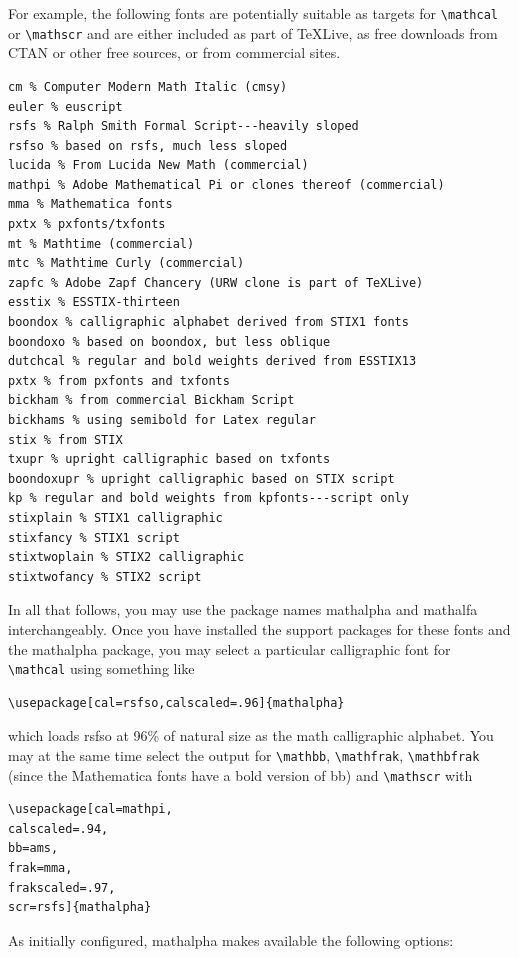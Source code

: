 \documentclass[11pt]{article}
\begin{document}
For example, the following fonts are potentially suitable as  targets for \verb|\mathcal| or \verb|\mathscr| and are either included as part of \TeX Live, as free downloads from CTAN or other free sources, or from commercial sites.
\begin{verbatim}
cm % Computer Modern Math Italic (cmsy)
euler % euscript
rsfs % Ralph Smith Formal Script---heavily sloped
rsfso % based on rsfs, much less sloped
lucida % From Lucida New Math (commercial)
mathpi % Adobe Mathematical Pi or clones thereof (commercial)
mma % Mathematica fonts
pxtx % pxfonts/txfonts
mt % Mathtime (commercial)
mtc % Mathtime Curly (commercial)
zapfc % Adobe Zapf Chancery (URW clone is part of TeXLive)
esstix % ESSTIX-thirteen
boondox % calligraphic alphabet derived from STIX1 fonts
boondoxo % based on boondox, but less oblique
dutchcal % regular and bold weights derived from ESSTIX13
pxtx % from pxfonts and txfonts
bickham % from commercial Bickham Script
bickhams % using semibold for Latex regular
stix % from STIX
txupr % upright calligraphic based on txfonts
boondoxupr % upright calligraphic based on STIX script 
kp % regular and bold weights from kpfonts---script only
stixplain % STIX1 calligraphic
stixfancy % STIX1 script
stixtwoplain % STIX2 calligraphic
stixtwofancy % STIX2 script
\end{verbatim}
In all that follows, you may use the package names \textsf{mathalpha} and \textsf{mathalfa} interchangeably. Once you have installed the support packages for these fonts and the \textsf{mathalpha} package, you may select a particular calligraphic font for \verb|\mathcal| using something like
\begin{verbatim}
\usepackage[cal=rsfso,calscaled=.96]{mathalpha}
\end{verbatim}
which loads \textsf{rsfso} at 96\% of natural size as the math calligraphic alphabet. You may at the same time select the output for \verb|\mathbb|, \verb|\mathfrak|, \verb|\mathbfrak| (since the Mathematica fonts have a bold version of bb) and \verb|\mathscr| with
\begin{verbatim}
\usepackage[cal=mathpi,
calscaled=.94,
bb=ams,
frak=mma,
frakscaled=.97,
scr=rsfs]{mathalpha}
\end{verbatim}
As initially configured, \textsf{mathalpha} makes available the following options:
\end{document}
